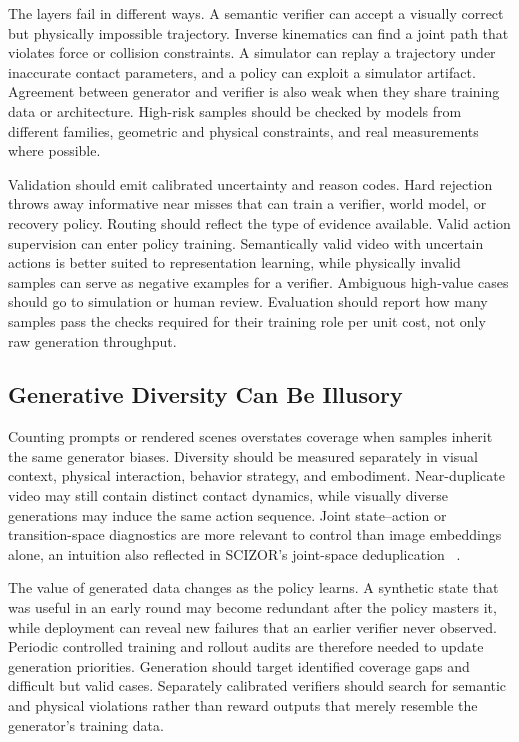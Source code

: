 

The layers fail in different ways.
A semantic verifier can accept a visually correct but physically impossible trajectory.
Inverse kinematics can find a joint path that violates force or collision constraints.
A simulator can replay a trajectory under inaccurate contact parameters, and a policy can exploit a simulator artifact.
Agreement between generator and verifier is also weak when they share training data or architecture.
High-risk samples should be checked by models from different families, geometric and physical constraints, and real measurements where possible.

Validation should emit calibrated uncertainty and reason codes.
Hard rejection throws away informative near misses that can train a verifier, world model, or recovery policy.
Routing should reflect the type of evidence available.
Valid action supervision can enter policy training.
Semantically valid video with uncertain actions is better suited to representation learning, while physically invalid samples can serve as negative examples for a verifier.
Ambiguous high-value cases should go to simulation or human review.
Evaluation should report how many samples pass the checks required for their training role per unit cost, not only raw generation throughput.

\subsection{Generative Diversity Can Be Illusory}

Counting prompts or rendered scenes overstates coverage when samples inherit the same generator biases.
Diversity should be measured separately in visual context, physical interaction, behavior strategy, and embodiment.
Near-duplicate video may still contain distinct contact dynamics, while visually diverse generations may induce the same action sequence.
Joint state--action or transition-space diagnostics are more relevant to control than image embeddings alone, an intuition also reflected in SCIZOR's joint-space deduplication ~\cite{zhang2025scizor_2505_22626}.

The value of generated data changes as the policy learns.
A synthetic state that was useful in an early round may become redundant after the policy masters it, while deployment can reveal new failures that an earlier verifier never observed.
Periodic controlled training and rollout audits are therefore needed to update generation priorities.
Generation should target identified coverage gaps and difficult but valid cases.
Separately calibrated verifiers should search for semantic and physical violations rather than reward outputs that merely resemble the generator's training data.
